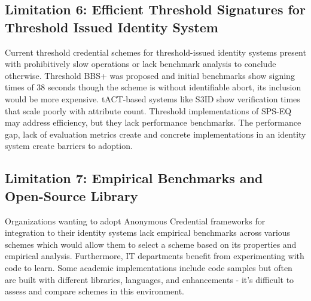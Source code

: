 \subsection{Limitation 6: Efficient Threshold Signatures for Threshold Issued Identity System}
Current threshold credential schemes for threshold-issued identity systems present with prohibitively slow operations or lack benchmark analysis to conclude otherwise. Threshold BBS+ was proposed \cite{doerner_threshold_2023} and initial benchmarks show signing times of 38 seconds \cite{dock_network_crypto_2025} though the scheme is without identifiable abort, its inclusion would be more expensive. tACT-based systems like S3ID \cite{rabaninejad_attribute-based_2024} show verification times that scale poorly with attribute count. Threshold implementations of SPS-EQ \cite{steinfeld_threshold_2023} may address efficiency, but they lack performance benchmarks. The performance gap, lack of evaluation metrics create and concrete implementations in an identity system create barriers to adoption. 


\subsection{Limitation 7: Empirical Benchmarks and Open-Source Library}
Organizations wanting to adopt Anonymous Credential frameworks for integration to their identity systems lack empirical benchmarks across various schemes which would allow them to select a scheme based on its properties and empirical analysis. Furthermore, IT departments benefit from experimenting with code to learn. Some academic implementations include code samples but often are built with different libraries, languages, and enhancements - it's difficult to assess and compare schemes in this environment. 
























